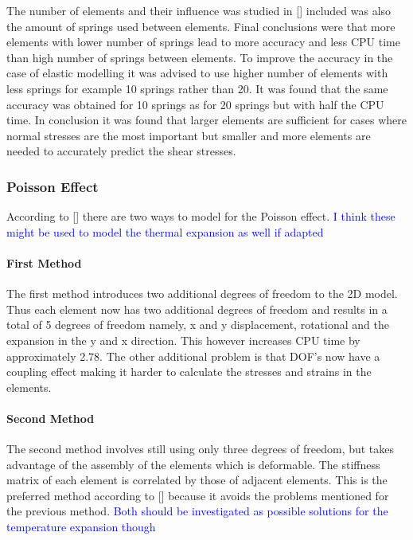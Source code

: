 The number of elements and their influence was studied in [\cite{First_AEM}] included was also the amount of springs used between elements.  Final conclusions were that more elements with lower number of springs lead to more accuracy and less CPU time than high number of springs between elements.  To improve the accuracy in the case of elastic modelling it was advised to use higher number of elements with less springs for example 10 springs rather than 20.  It was found that the same accuracy was obtained for 10 springs as for 20 springs but with half the CPU time.  In conclusion it was found that larger elements are sufficient for cases where normal stresses are the most important but smaller and more elements are needed to accurately predict the shear stresses. 

\subsubsection{Poisson Effect}

According to [\cite{First_AEM}] there are two ways to model for the Poisson effect.  \textcolor{blue}{I think these might be used to model the thermal expansion as well if adapted}


\paragraph{First Method} The first method introduces two additional degrees of freedom to the 2D model.  Thus each element now has two additional degrees of freedom and results in a total of 5 degrees of freedom namely, x and y displacement, rotational and the expansion in the y and x direction.  This however increases CPU time by approximately 2.78.  The other additional problem is that DOF's now have a coupling effect making it harder to calculate the stresses and strains in the elements. 

\paragraph{Second Method}  The second method involves still using only three degrees of freedom, but takes advantage of the assembly of the elements which is deformable.  The stiffness matrix of each element is correlated by those of adjacent elements.  This is the preferred method according to [\cite{First_AEM}] because it avoids the problems mentioned for the previous method.  \textcolor{blue}{Both should be investigated as possible solutions for the temperature expansion though}


